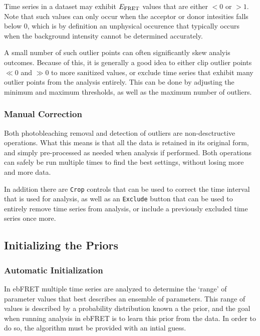 \documentclass[12pt,article,oldfontcommands]{memoir}
\begin{document}
Time series in a dataset may exhibit $E_{\rm FRET}$ values that are either $< 0$  or $> 1$. Note that such values can only occur when the acceptor or donor intesities falls below 0, which is by definition an unphysical occurence that typically occurs when the background intensity cannot be determined accurately.

A small number of such outlier points can often significantly skew analyis outcomes. Because of this, it is generally a good idea to either clip outlier points $\ll 0$ and $\gg 0$ to more sanitized values, or exclude time series that exhibit many outlier points from the analysis entirely.
This can be done by adjusting the minimum and maximum thresholds, as well as the maximum number of outliers.

\subsubsection{Manual Correction}

Both photobleaching removal and detection of outliers are non-desctructive operations. What this means is that all the data is retained in its original form, and simply pre-processed as needed when analysis if performed. Both operations can safely be run multiple times to find the best settings, without losing more and more data. 

In addition there are \texttt{Crop} controls that can be used to correct the time interval that is used for analysis, as well as an \texttt{Exclude} button that can be used to entirely remove time series from analysis, or include a previously excluded time series once more.

\subsection{Initializing the Priors}

\subsubsection{Automatic Initialization}

In ebFRET multiple time series are analyzed to determine the `range' of parameter values that best describes an ensemble of parameters. This range of values is described by a probability distribution known a the prior, and the goal when running analysis in ebFRET is to learn this prior from the data. In order to do so, the algorithm must be provided with an intial guess.
\end{document}

